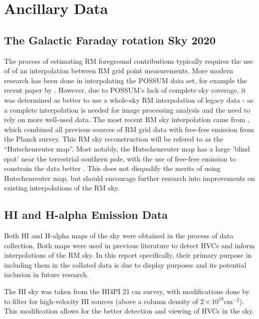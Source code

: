 \section{Ancillary Data}
\label{sec:data}

\subsection{The Galactic Faraday rotation Sky 2020}
\label{ssec:legacy}

The process of estimating RM foreground contributions typically requires the use of of an interpolation between RM grid point measurements. More modern research has been done in interpolating the POSSUM data set, for example the recent paper by \cite{ID58}. However, due to POSSUM's lack of complete sky coverage, it was determined as better to use a whole-sky RM interpolation of legacy data - as a complete interpolation is needed for image processing analysis and the need to rely on more well-used data. The most recent RM sky interpolation came from \cite{ID44, ID45}, which combined all previous sources of RM grid data with free-free emission from the Planck survey. This RM sky reconstruction will be refered to as the “Hutschenreuter map”. Most notably, the Hutschenreuter map has a large 'blind spot' near the terrestrial southern pole, with the use of free-free emission to constrain the data better \citep{ID44, ID45}. This does not disqualify the merits of using Hutschenreuter map, but should encourage further research into improvements on existing interpolations of the RM sky.

\subsection{HI and H-alpha Emission Data}
\label{ssec:other_data}

Both HI and H-alpha maps of the sky were obtained in the process of data collection. Both maps were used in previous literature to detect HVCs and inform interpolations of the RM sky. In this report specifically, their primary purpose in including them in the collated data is due to display purposes and its potential inclusion in future research. 


The HI sky was taken from the HI4PI 21 cm survey, with modifications done by \cite{ID6} to filter for high-velocity HI sources (above a column density of $2\times 10^{18} \mathrm{cm}^{-2}$). This modification allows for the better detection and viewing of HVCs in the sky.



